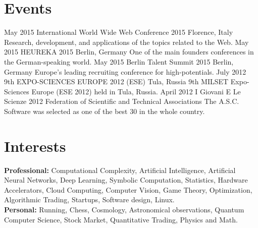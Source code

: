 \documentclass[]{friggeri-cv}
\begin{document}

\section{Events}
\vspace{-3mm}
\begin{entrylist}
\entry
{May 2015}
{International World Wide Web Conference 2015}
{Florence, Italy}
{Research, development, and applications of the topics related to the Web.}
\entry
{May 2015}
{HEUREKA 2015}
{Berlin, Germany}
{One of the main founders conferences in the German­-speaking world.}
\entry
{May 2015}
{Berlin Talent Summit 2015}
{Berlin, Germany}
{Europe's leading recruiting conference for high-potentials.}
\entry
{July 2012}
{9th EXPO-SCIENCES EUROPE 2012 (ESE)}
{Tula, Russia}
{9th MILSET Expo-Sciences Europe (ESE 2012) held in Tula, Russia.}
\entry
{April 2012}
{I Giovani E Le Scienze 2012}
{Federation of Scientific and Technical Associations}
{The A.S.C. Software was selected as one of the best 30 in the whole country.}
\end{entrylist}


\section{Interests}
\vspace{-3mm}
\textbf{Professional:} Computational Complexity, Artificial Intelligence, Artificial Neural Networks, Deep Learning, Symbolic Computation, Statistics, Hardware Accelerators, Cloud Computing, Computer Vision, Game Theory, Optimization, Algorithmic Trading, Startups, Software design, Linux.\\
\textbf{Personal:} Running, Chess, Cosmology, Astronomical observations, Quantum Computer Science, Stock Market, Quantitative Trading, Physics and Math.\\

\clearpage
\end{document}
